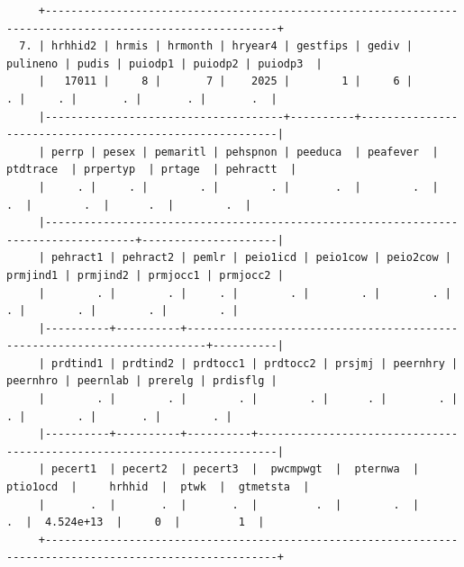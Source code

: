 \documentclass[
]{book}
\begin{document}
\begin{verbatim}
     +----------------------------------------------------------------------------------------------------------+
  7. | hrhhid2 | hrmis | hrmonth | hryear4 | gestfips | gediv | pulineno | pudis | puiodp1 | puiodp2 | puiodp3  |
     |   17011 |     8 |       7 |    2025 |        1 |     6 |        . |     . |       . |       . |       .  |
     |-------------------------------------+----------+---------------------------------------------------------|
     | perrp | pesex | pemaritl | pehspnon | peeduca  | peafever  | ptdtrace  | prpertyp  | prtage  | pehractt  |
     |     . |     . |        . |        . |       .  |        .  |        .  |        .  |      .  |        .  |
     |------------------------------------------------------------------------------------+---------------------|
     | pehract1 | pehract2 | pemlr | peio1icd | peio1cow | peio2cow | prmjind1 | prmjind2 | prmjocc1 | prmjocc2 |
     |        . |        . |     . |        . |        . |        . |        . |        . |        . |        . |
     |----------+----------+-------------------------------------------------------------------------+----------|
     | prdtind1 | prdtind2 | prdtocc1 | prdtocc2 | prsjmj | peernhry | peernhro | peernlab | prerelg | prdisflg |
     |        . |        . |        . |        . |      . |        . |        . |        . |       . |        . |
     |----------+----------+----------+-------------------------------------------------------------------------|
     | pecert1  | pecert2  | pecert3  |  pwcmpwgt  |  pternwa  |  ptio1ocd  |     hrhhid  |  ptwk  |  gtmetsta  |
     |       .  |       .  |       .  |         .  |        .  |         .  |  4.524e+13  |     0  |         1  |
     +----------------------------------------------------------------------------------------------------------+


\end{verbatim}
\end{document}
